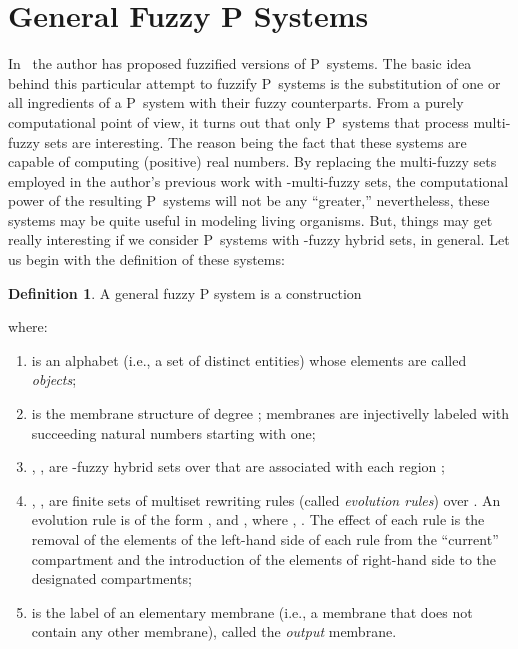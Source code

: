 \documentclass{amsart}
\theoremstyle{definition}
\newtheorem{definition}[theorem]{Definition}
\begin{document}
\section{General Fuzzy P Systems}
In~\cite{syropoulos06} the author has proposed fuzzified versions of P~systems.
The basic idea behind this particular attempt to fuzzify P~systems is the 
substitution of one or all ingredients of a P~system with their fuzzy 
counterparts. From a purely computational point of view, it turns out that only P~systems 
that process multi-fuzzy sets are interesting. The reason being the fact that these systems 
are capable of computing (positive) real numbers. By replacing the multi-fuzzy sets employed 
in the author's previous work with -multi-fuzzy sets, the computational power of the resulting 
P~systems will not be any ``greater,''  nevertheless, these systems may be quite useful in modeling 
living organisms. But, things may get really interesting if we consider P~systems with
-fuzzy hybrid sets, in general. Let us begin with the definition of these systems:
\begin{definition}\label{f:data}
A general fuzzy P system is a construction

where:
\begin{enumerate}
\item  is an alphabet (i.e., a set of distinct entities) whose elements
      are called \textit{objects};
\item  is the membrane structure of degree ; membranes
      are injectivelly labeled with succeeding natural numbers starting with
      one;
\item , ,
      are -fuzzy hybrid sets over  that are associated with each region ;
\item , , are finite sets of multiset rewriting rules
      (called
      \textit{evolution rules}) over . An evolution rule is of the form
      ,  and ,
      where ,
      . The effect of each rule is the removal of the
      elements of the left-hand side of each rule from the
      ``current'' compartment and the introduction of the elements of
      right-hand side to the designated compartments;
\item  is the label of an elementary membrane (i.e.,
      a membrane that does not contain any other membrane), called the
      \textit{output} membrane.
\end{enumerate}
\end{definition}
\end{document}
